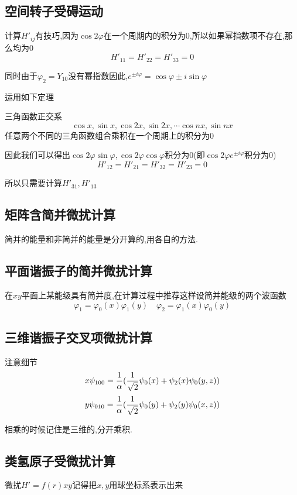         \subsection{空间转子受碍运动}
            计算$H'_{ij}$有技巧,因为$\cos{2\varphi}$在一个周期内的积分为0,所以如果幂指数项不存在,那么均为0
            $$ H'_{11} = H'_{22} = H'_{33} = 0 $$

            同时由于$\varphi_{2} = Y_{10}$没有幂指数因此,$e^{\pm i \varphi} = \cos{\varphi}  \pm i \sin{\varphi}$

            运用如下定理
            \begin{formal}
                三角函数正交系
                $$ \cos{x},\sin{x},\cos{2x},\sin{2x},\cdots\cos{nx},\sin{nx}$$
                任意两个不同的三角函数组合乘积在一个周期上的积分为0
            \end{formal}
            因此我们可以得出$ \cos{2\varphi}\sin{\varphi},\cos{2\varphi}\cos{\varphi}$积分为0(即$\cos{2\varphi} e^{\pm i\varphi}$积分为0)
            $$ H'_{12} = H'_{21} = H'_{32} = H'_{23} = 0 $$
            
            所以只需要计算$H'_{31} , H'_{13}$

        \subsection{矩阵含简并微扰计算}
            简并的能量和非简并的能量是分开算的,用各自的方法.

        \subsection{平面谐振子的简并微扰计算}
            在$xy$平面上某能级具有简并度,在计算过程中推荐这样设简并能级的两个波函数
            $$ \varphi_{1} = \varphi_{0}(x)\varphi_{1}(y) \quad \varphi_{2} = \varphi_{1}(x) \varphi_{0}(y) $$


        \subsection{三维谐振子交叉项微扰计算}
            注意细节
            $$ x\psi_{100} = \frac{1}{\alpha} (\frac{1}{\sqrt{2}} \psi_{0} (x) + \psi_{2} (x) \psi_{0} (y,z)) $$
            $$ y\psi_{010} = \frac{1}{\alpha} (\frac{1}{\sqrt{2}} \psi_{0} (y) + \psi_{2} (y) \psi_{0} (x,z)) $$

            相乘的时候记住是三维的,分开乘积.


        \subsection{类氢原子受微扰计算}
            微扰$ H' = f(r)xy $记得把$x,y$用球坐标系表示出来

